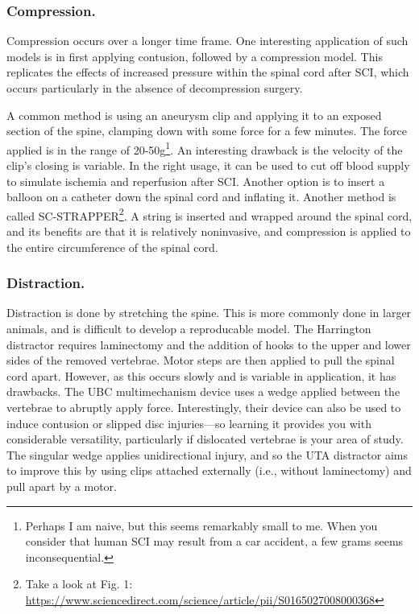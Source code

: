 \documentclass[12pt]{report}
\begin{document}
\subsubsection{Compression.}
Compression occurs over a longer time frame. One interesting application of such models is in first applying contusion, followed by a compression model. This replicates the effects of increased pressure within the spinal cord after SCI, which occurs particularly in the absence of decompression surgery.\newline

A common method is using an aneurysm clip and applying it to an exposed section of the spine, clamping down with some force for a few minutes. The force applied is in the range of 20-50g\footnote{Perhaps I am naive, but this seems remarkably small to me. When you consider that human SCI may result from a car accident, a few grams seems inconsequential.}. An interesting drawback is the velocity of the clip's closing is variable. In the right usage, it can be used to cut off blood supply to simulate ischemia and reperfusion after SCI. Another option is to insert a balloon on a catheter down the spinal cord and inflating it. Another method is called SC-STRAPPER\footnote{Take a look at Fig. 1: \url{https://www.sciencedirect.com/science/article/pii/S0165027008000368} }. A string is inserted and wrapped around the spinal cord, and its benefits are that it is relatively noninvasive, and compression is applied to the entire circumference of the spinal cord. 

\subsubsection{Distraction.}
Distraction is done by stretching the spine. This is more commonly done in larger animals, and is difficult to develop a reproducable model. The Harrington distractor requires laminectomy and the addition of hooks to the upper and lower sides of the removed vertebrae. Motor steps are then applied to pull the spinal cord apart. However, as this occurs slowly and is variable in application, it has drawbacks. The UBC multimechanism device uses a wedge applied between the vertebrae to abruptly apply force. Interestingly, their device can also be used to induce contusion or slipped disc injuries---so learning it provides you with considerable versatility, particularly if dislocated vertebrae is your area of study. The singular wedge applies unidirectional injury, and so the UTA distractor aims to improve this by using clips attached externally (i.e., without laminectomy) and pull apart by a motor. 
\end{document}
